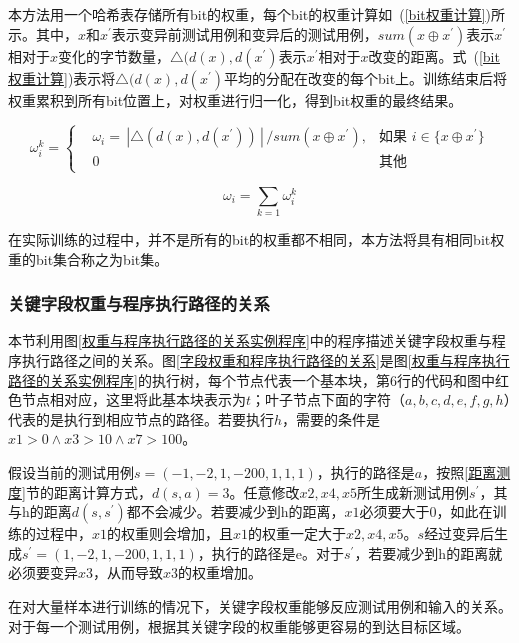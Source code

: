 本方法用一个哈希表存储所有bit的权重，每个bit的权重计算如~(\ref{bit权重计算})所示。其中，$x$和$x^{'}$表示变异前测试用例和变异后的测试用例，$sum(x \oplus x^{'})$表示$x^{'}$相对于$x$变化的字节数量，$\bigtriangleup (d(x),d(x^{'})$表示$x^{'}$相对于$x$改变的距离。式~(\ref{bit权重计算})表示将$\bigtriangleup (d(x),d(x^{'})$平均的分配在改变的每个bit上。训练结束后将权重累积到所有bit位置上，对权重进行归一化，得到bit权重的最终结果。

\begin{equation}\label{bit权重计算}
\omega^{k}_{i}=\left\{
\begin{aligned}
& \omega_{i} =\,| \bigtriangleup (d(x),d(x^{'})) \,|\,/sum(x \oplus x^{'}), & \text{如果 } i \in \{ x \oplus x^{'} \}\\
& 0 & \text{其他}
\end{aligned}
\right.
\end{equation} 

\begin{equation}\label{bit权重累积}
\omega_{i} = \sum_{k=1} \omega^{k}_{i}
\end{equation}

在实际训练的过程中，并不是所有的bit的权重都不相同，本方法将具有相同bit权重的bit集合称之为bit集。

\subsubsection{关键字段权重与程序执行路径的关系}

本节利用图\ref{权重与程序执行路径的关系实例程序}中的程序描述关键字段权重与程序执行路径之间的关系。图\ref{字段权重和程序执行路径的关系}是图\ref{权重与程序执行路径的关系实例程序}的执行树，每个节点代表一个基本块，第6行的代码和图中红色节点相对应，这里将此基本块表示为$t$；叶子节点下面的字符（$a,b,c,d,e,f,g,h$）代表的是执行到相应节点的路径。若要执行$h$，需要的条件是$x1>0 \wedge x3>10 \wedge x7>100$。

假设当前的测试用例$s=(-1,-2,1,-200,1,1,1)$，执行的路径是$a$，按照\ref{距离测度}节的距离计算方式，$d(s,a) = 3$。任意修改$x2,x4,x5$所生成新测试用例$s^{'}$，其与h的距离$d(s,s^{'})$都不会减少。若要减少到h的距离，$x1$必须要大于0，如此在训练的过程中，$x1$的权重则会增加，且$x1$的权重一定大于$x2,x4,x5$。$s$经过变异后生成$s^{'}=(1,-2,1,-200,1,1,1)$，执行的路径是e。对于$s^{'}$，若要减少到h的距离就必须要变异$x3$，从而导致$x3$的权重增加。

在对大量样本进行训练的情况下，关键字段权重能够反应测试用例和输入的关系。对于每一个测试用例，根据其关键字段的权重能够更容易的到达目标区域。

